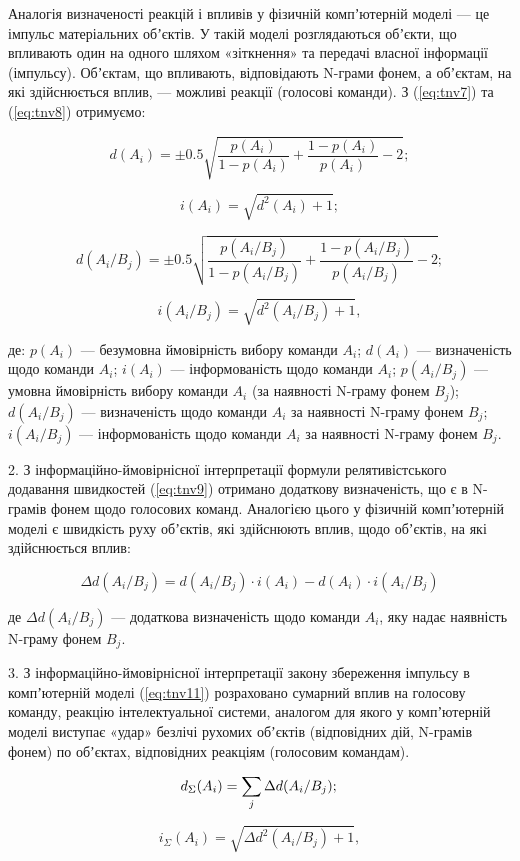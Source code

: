 Аналогія визначеності реакцій і впливів у фізичній компʼютерній моделі --- це імпульс матеріальних обʼєктів. У такій моделі розглядаються обʼєкти, що впливають один на одного шляхом «зіткнення» та передачі власної інформації (імпульсу). Обʼєктам, що впливають, відповідають N-грами фонем, а обʼєктам, на які здійснюється вплив, --- можливі реакції (голосові команди). З (\ref{eq:tnv7}) та (\ref{eq:tnv8}) отримуємо:

\[
d(A_i)=\pm0.5\sqrt{\frac{p(A_i)}{1-p(A_i)}+\frac{1-p(A_i)}{p(A_i)}-2};
\]

\[
i(A_i)=\sqrt{d^2(A_i)+1};
\]

\[
d(A_i/B_j)=\pm0.5\sqrt{\frac{p(A_i/B_j)}{1-p(A_i/B_j)}+\frac{1-p(A_i/B_j)}{p(A_i/B_j)}-2};
\]

\[
i(A_i/B_j)=\sqrt{d^2(A_i/B_j)+1},
\]

\noindent
де: $p(A_i)$ --- безумовна ймовірність вибору команди $A_i$; $d(A_i)$ --- визначеність щодо команди $A_i$; $i(A_i)$ --- інформованість щодо команди $A_i$; $p(A_i/B_j)$ --- умовна ймовірність вибору команди $A_i$ (за наявності N-граму фонем $B_j$); $d(A_i/B_j)$ --- визначеність щодо команди $A_i$ за наявності N-граму фонем $B_j$; $i(A_i/B_j)$ --- інформованість щодо команди $A_i$ за наявності N-граму фонем $B_j$.

2. З інформаційно-ймовірнісної інтерпретації формули релятивістського додавання швидкостей (\ref{eq:tnv9}) отримано додаткову визначеність, що є в N-грамів фонем щодо голосових команд. Аналогією цього у фізичній компʼютерній моделі є швидкість руху обʼєктів, які здійснюють вплив, щодо обʼєктів, на які здійснюється вплив:

\[
\Delta d(A_i/B_j)=d(A_i/B_j)\cdot i(A_i)-d(A_i)\cdot i(A_i/B_j)
\]

\noindent
де $\Delta d(A_i/B_j)$ --- додаткова визначеність щодо команди $A_i$, яку надає наявність N-граму фонем $B_j$.

3. З інформаційно-ймовірнісної інтерпретації закону збереження імпульсу в компʼютерній моделі (\ref{eq:tnv11}) розраховано сумарний вплив на голосову команду, реакцію інтелектуальної системи, аналогом для якого у компʼютерній моделі виступає «удар» безлічі рухомих обʼєктів (відповідних дій, N-грамів фонем) по обʼєктах, відповідних реакціям (голосовим командам).

\[
d_\Sigma(A_i) = \sum_j \Delta d(A_i/B_j); \\
\]

\[
i_\Sigma(A_i) = \sqrt{\Delta d^2(A_i/B_j)+1},
\]

